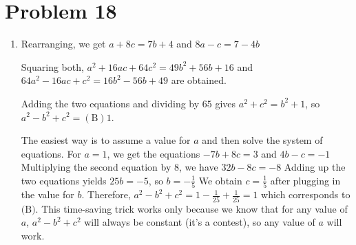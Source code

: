 \documentclass{article}%
\begin{document}
\section*{Problem 18}%
\label{sec:Problem18}%
\begin{enumerate}%
\item%
Rearranging, we get $a+8c=7b+4$ and $8a-c=7-4b$

Squaring both, $a^2+16ac+64c^2=49b^2+56b+16$ and $64a^2-16ac+c^2=16b^2-56b+49$ are obtained.

Adding the two equations and dividing by $65$ gives $a^2+c^2=b^2+1$, so $a^2-b^2+c^2=\boxed{(\text{B})1}$.

The easiest way is to assume a value for $a$ and then solve the system of equations. For $a = 1$, we get the equations 
$-7b + 8c = 3$ and
$4b - c = -1$
Multiplying the second equation by $8$, we have 
$32b - 8c = -8$
Adding up the two equations yields 
$25b = -5$, so $b = -\frac{1}{5}$
We obtain $c = \frac{1}{5}$ after plugging in the value for $b$.
Therefore, $a^2-b^2+c^2 = 1-\frac{1}{25}+\frac{1}{25}=\boxed{1}$ which corresponds to $\text{(B)}$.
This time-saving trick works only because we know that for any value of $a$, $a^2-b^2+c^2$ will always be constant (it's a contest), so any value of $a$ will work.

%
\end{enumerate}

%
\end{document}
